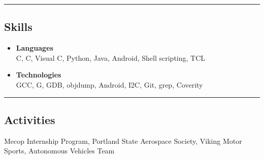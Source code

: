 \documentclass[10pt,letterpaper]{article}
\newcommand{\CPP}
{C\nolinebreak[4]\hspace{-.05em}\raisebox{.22ex}{\footnotesize\bf ++}}
\newcommand{\GPP}
{G\nolinebreak[4]\hspace{-.05em}\raisebox{.22ex}{\footnotesize\bf ++}}
\begin{document}
\hrule

\subsection*{Skills}
	\begin{itemize}
		\item 
		\textbf{Languages}\\
		 C, \CPP, Visual \CPP,  Python, Java, Android, Shell scripting, TCL
		\item
		\textbf{Technologies}\\
		GCC, \GPP{}, GDB, objdump, Android, I2C, Git, grep, Coverity
	\end{itemize}

\hrule

\subsection*{Activities}
Mecop Internship Program, Portland State Aerospace Society, Viking Motor Sports, Autonomous Vehicles Team
\end{document}
